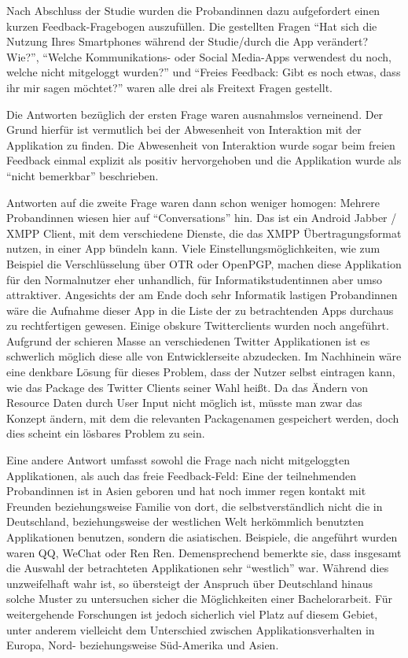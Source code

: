 Nach Abschluss der Studie wurden die Probandinnen dazu aufgefordert einen kurzen Feedback-Fragebogen auszufüllen.
Die gestellten Fragen "`Hat sich die Nutzung Ihres Smartphones während der Studie/durch die App verändert? Wie?"', "`Welche Kommunikations- oder Social Media-Apps verwendest du noch, welche nicht mitgeloggt wurden?"' und "`Freies Feedback: Gibt es noch etwas, dass ihr mir sagen möchtet?"' waren alle drei als Freitext Fragen gestellt.
\par
Die Antworten bezüglich der ersten Frage waren ausnahmslos verneinend.
Der Grund hierfür ist vermutlich bei der Abwesenheit von Interaktion mit der Applikation zu finden.
Die Abwesenheit von Interaktion wurde sogar beim freien Feedback einmal explizit als positiv hervorgehoben und die Applikation wurde als "`nicht bemerkbar"' beschrieben.
\par
Antworten auf die zweite Frage waren dann schon weniger homogen:
Mehrere Probandinnen wiesen hier auf "`Conversations"' hin. 
Das ist ein Android Jabber / XMPP Client, mit dem verschiedene Dienste, die das XMPP Übertragungsformat nutzen, in einer App bündeln kann.
Viele Einstellungsmöglichkeiten, wie zum Beispiel die Verschlüsselung über OTR oder OpenPGP, machen diese Applikation für den Normalnutzer eher unhandlich, für Informatikstudentinnen aber umso attraktiver.
Angesichts der am Ende doch sehr Informatik lastigen Probandinnen wäre die Aufnahme dieser App in die Liste der zu betrachtenden Apps durchaus zu rechtfertigen gewesen.
Einige obskure Twitterclients wurden noch angeführt.
Aufgrund der schieren Masse an verschiedenen Twitter Applikationen ist es schwerlich möglich diese alle von Entwicklerseite abzudecken. 
Im Nachhinein wäre eine denkbare Lösung für dieses Problem, dass der Nutzer selbst eintragen kann, wie das Package des Twitter Clients seiner Wahl heißt.
Da das Ändern von Resource Daten durch User Input nicht möglich ist, müsste man zwar das Konzept ändern, mit dem die relevanten Packagenamen gespeichert werden, doch dies scheint ein lösbares Problem zu sein.
\par
Eine andere Antwort umfasst sowohl die Frage nach nicht mitgeloggten Applikationen, als auch das freie Feedback-Feld:
Eine der teilnehmenden Probandinnen ist in Asien geboren und hat noch immer regen kontakt mit Freunden beziehungsweise Familie von dort, 
die selbstverständlich nicht die in Deutschland, beziehungsweise der westlichen Welt herkömmlich benutzten Applikationen benutzen, sondern die asiatischen.
Beispiele, die angeführt wurden waren QQ, WeChat oder Ren Ren.
Demensprechend bemerkte sie, dass insgesamt die Auswahl der betrachteten Applikationen sehr "`westlich"' war.
Während dies unzweifelhaft wahr ist, so übersteigt der Anspruch über Deutschland hinaus solche Muster zu untersuchen sicher die Möglichkeiten einer Bachelorarbeit.
Für weitergehende Forschungen ist jedoch sicherlich viel Platz auf diesem Gebiet, unter anderem vielleicht dem Unterschied zwischen Applikationsverhalten in Europa, Nord- beziehungsweise Süd-Amerika und Asien. 
\par

